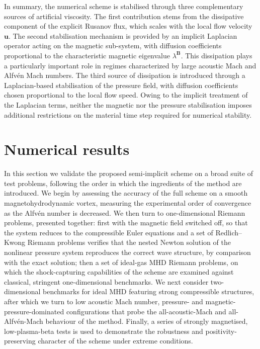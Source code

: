 \documentclass[a4paper,fleqn]{cas-sc}
\theoremstyle{definition}
\theoremstyle{remark}
\begin{document}
In summary, the numerical scheme is stabilised through three complementary sources of
artificial viscosity. The first contribution stems from the dissipative component of
the explicit Rusanov flux, which scales with the local flow velocity $\mathbf{u}$. The
second stabilisation mechanism is provided by an implicit Laplacian operator acting on
the magnetic sub-system, with diffusion coefficients proportional to the characteristic
magnetic eigenvalue $\lambda^\mathbf{B}$. This dissipation plays a particularly important role in regimes characterized by large acoustic Mach and Alfv\'en Mach numbers. The third source of dissipation is introduced through a
Laplacian-based stabilisation of the pressure field, with diffusion coefficients chosen
proportional to the local flow speed. Owing to the implicit treatment of the Laplacian
terms, neither the magnetic nor the pressure stabilisation imposes additional
restrictions on the material time step required for numerical stability.

\section{Numerical results}

In this section we validate the proposed semi-implicit scheme on a broad suite of test
problems, following the order in which the ingredients of the method are introduced. We begin by assessing the accuracy of the full scheme on a smooth magnetohydrodynamic
vortex, measuring the experimental order of convergence as the Alfv\'en number is
decreased. We then turn to one-dimensional Riemann problems, presented together: first
with the magnetic field switched off, so that the system reduces to the compressible
Euler equations and a set of Redlich--Kwong Riemann problems verifies that the nested
Newton solution of the nonlinear pressure system reproduces the correct wave structure,
by comparison with the exact solution; then a set of ideal-gas MHD Riemann problems, on
which the shock-capturing capabilities of the scheme are examined against classical,
stringent one-dimensional benchmarks. We next consider two-dimensional benchmarks for
ideal MHD featuring strong compressible structures, after which we turn to low acoustic
Mach number, pressure- and magnetic-pressure-dominated configurations that probe the
all-acoustic-Mach and all-Alfv\'en-Mach behaviour of the method. Finally, a series of
strongly magnetised, low-plasma-beta tests is used to demonstrate the robustness and
positivity-preserving character of the scheme under extreme conditions.
\end{document}
